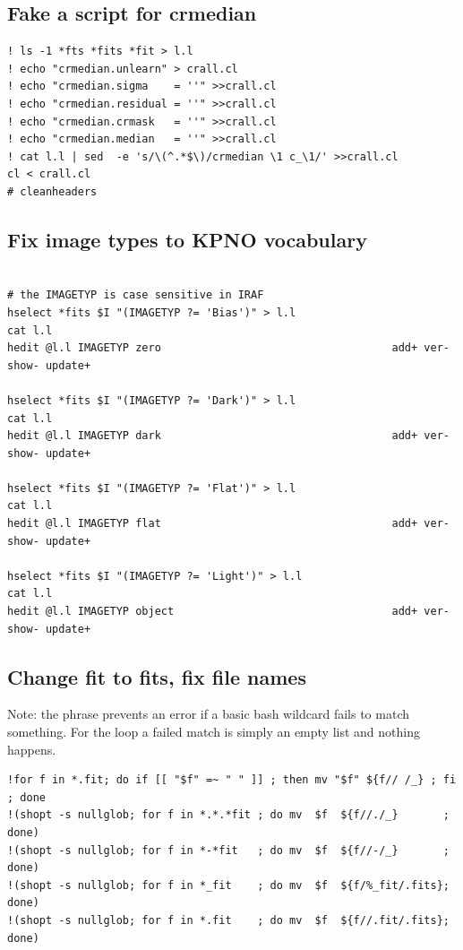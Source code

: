 \documentclass[letter,11pt,oneside]{article}
\newcommand{\dhl}[1]{{\color{verbcolor}{\texttt#1}}}
\begin{document}
\subsection{Fake a script for crmedian}

{\color{verbcolor}
\begin{verbatim}
! ls -1 *fts *fits *fit > l.l
! echo "crmedian.unlearn" > crall.cl
! echo "crmedian.sigma    = ''" >>crall.cl
! echo "crmedian.residual = ''" >>crall.cl
! echo "crmedian.crmask   = ''" >>crall.cl
! echo "crmedian.median   = ''" >>crall.cl
! cat l.l | sed  -e 's/\(^.*$\)/crmedian \1 c_\1/' >>crall.cl
cl < crall.cl
# cleanheaders
\end{verbatim}
}

\subsection{Fix image types to KPNO vocabulary}

{\color{verbcolor}
\begin{verbatim}

# the IMAGETYP is case sensitive in IRAF
hselect *fits $I "(IMAGETYP ?= 'Bias')" > l.l
cat l.l
hedit @l.l IMAGETYP zero                                    add+ ver- show- update+

hselect *fits $I "(IMAGETYP ?= 'Dark')" > l.l
cat l.l
hedit @l.l IMAGETYP dark                                    add+ ver- show- update+

hselect *fits $I "(IMAGETYP ?= 'Flat')" > l.l
cat l.l
hedit @l.l IMAGETYP flat                                    add+ ver- show- update+

hselect *fits $I "(IMAGETYP ?= 'Light')" > l.l
cat l.l
hedit @l.l IMAGETYP object                                  add+ ver- show- update+

\end{verbatim}
}

\subsection{Change fit to fits, fix file names}

Note: the \dhl{shopt -s nullglob} phrase prevents an error if a 
basic bash wildcard fails to match something. For the \dhl{for}
loop a failed match is simply an empty list and nothing happens.

{\color{verbcolor}
\begin{verbatim}
!for f in *.fit; do if [[ "$f" =~ " " ]] ; then mv "$f" ${f// /_} ; fi ; done
!(shopt -s nullglob; for f in *.*.*fit ; do mv  $f  ${f//./_}       ; done)
!(shopt -s nullglob; for f in *-*fit   ; do mv  $f  ${f//-/_}       ; done)
!(shopt -s nullglob; for f in *_fit    ; do mv  $f  ${f/%_fit/.fits}; done)
!(shopt -s nullglob; for f in *.fit    ; do mv  $f  ${f//.fit/.fits}; done)
\end{verbatim}
}
\end{document}
